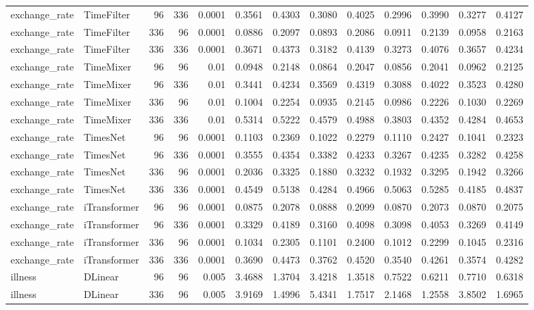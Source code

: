\begin{longtable}{@{}llrrr*{8}{r}@{}}
exchange\_rate & TimeFilter & 96 & 336 & 0.0001 & 0.3561 & 0.4303 & 0.3080 & 0.4025 & 0.2996 & 0.3990 & 0.3277 & 0.4127 \\
exchange\_rate & TimeFilter & 336 & 96 & 0.0001 & 0.0886 & 0.2097 & 0.0893 & 0.2086 & 0.0911 & 0.2139 & 0.0958 & 0.2163 \\
exchange\_rate & TimeFilter & 336 & 336 & 0.0001 & 0.3671 & 0.4373 & 0.3182 & 0.4139 & 0.3273 & 0.4076 & 0.3657 & 0.4234 \\
exchange\_rate & TimeMixer & 96 & 96 & 0.01 & 0.0948 & 0.2148 & 0.0864 & 0.2047 & 0.0856 & 0.2041 & 0.0962 & 0.2125 \\
exchange\_rate & TimeMixer & 96 & 336 & 0.01 & 0.3441 & 0.4234 & 0.3569 & 0.4319 & 0.3088 & 0.4022 & 0.3523 & 0.4280 \\
exchange\_rate & TimeMixer & 336 & 96 & 0.01 & 0.1004 & 0.2254 & 0.0935 & 0.2145 & 0.0986 & 0.2226 & 0.1030 & 0.2269 \\
exchange\_rate & TimeMixer & 336 & 336 & 0.01 & 0.5314 & 0.5222 & 0.4579 & 0.4988 & 0.3803 & 0.4352 & 0.4284 & 0.4653 \\
exchange\_rate & TimesNet & 96 & 96 & 0.0001 & 0.1103 & 0.2369 & 0.1022 & 0.2279 & 0.1110 & 0.2427 & 0.1041 & 0.2323 \\
exchange\_rate & TimesNet & 96 & 336 & 0.0001 & 0.3555 & 0.4354 & 0.3382 & 0.4233 & 0.3267 & 0.4235 & 0.3282 & 0.4258 \\
exchange\_rate & TimesNet & 336 & 96 & 0.0001 & 0.2036 & 0.3325 & 0.1880 & 0.3232 & 0.1932 & 0.3295 & 0.1942 & 0.3266 \\
exchange\_rate & TimesNet & 336 & 336 & 0.0001 & 0.4549 & 0.5138 & 0.4284 & 0.4966 & 0.5063 & 0.5285 & 0.4185 & 0.4837 \\
exchange\_rate & iTransformer & 96 & 96 & 0.0001 & 0.0875 & 0.2078 & 0.0888 & 0.2099 & 0.0870 & 0.2073 & 0.0870 & 0.2075 \\
exchange\_rate & iTransformer & 96 & 336 & 0.0001 & 0.3329 & 0.4189 & 0.3160 & 0.4098 & 0.3098 & 0.4053 & 0.3269 & 0.4149 \\
exchange\_rate & iTransformer & 336 & 96 & 0.0001 & 0.1034 & 0.2305 & 0.1101 & 0.2400 & 0.1012 & 0.2299 & 0.1045 & 0.2316 \\
exchange\_rate & iTransformer & 336 & 336 & 0.0001 & 0.3690 & 0.4473 & 0.3762 & 0.4520 & 0.3540 & 0.4261 & 0.3574 & 0.4282 \\
illness & DLinear & 96 & 96 & 0.005 & 3.4688 & 1.3704 & 3.4218 & 1.3518 & 0.7522 & 0.6211 & 0.7710 & 0.6318 \\
illness & DLinear & 336 & 96 & 0.005 & 3.9169 & 1.4996 & 5.4341 & 1.7517 & 2.1468 & 1.2558 & 3.8502 & 1.6965 \\

\end{longtable}
